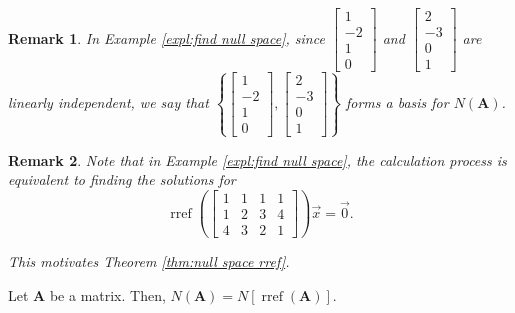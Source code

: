 \documentclass[]{book}
\DeclareMathOperator{\rref}{rref}
\newcommand{\mat}[1]{\ensuremath{\mathbf{#1}}}
\newtheorem*{remark}{Remark}
\begin{document}
\begin{remark}
    In Example \ref{expl:find null space}, since $\begin{bmatrix}1 \\ -2 \\ 1 \\ 0\end{bmatrix}$ and $\begin{bmatrix}2 \\ -3 \\ 0 \\ 1\end{bmatrix}$ are linearly independent, we say that $\left\{\begin{bmatrix}1 \\ -2 \\ 1 \\ 0\end{bmatrix}, \begin{bmatrix}2 \\ -3 \\ 0 \\ 1\end{bmatrix}\right\}$ forms a basis for $N(\mat{A})$.
\end{remark}
\begin{remark}
    Note that in Example \ref{expl:find null space}, the calculation process is equivalent to finding the solutions for \[\rref\left(\begin{bmatrix}1 & 1 & 1 & 1 \\ 1 & 2 & 3 & 4 \\ 4 & 3 & 2 & 1\end{bmatrix}\right) \vec{x} = \vec{0}.\] 
    
    This motivates Theorem \ref{thm:null space rref}.
\end{remark}
\begin{theorem}
    \label{thm:null space rref}
    Let $\mathbf{A}$ be a matrix. Then, $N(\mathbf{A}) = N\left[\rref\left(\mathbf{A}\right)\right]$.
\end{theorem}
\end{document}
